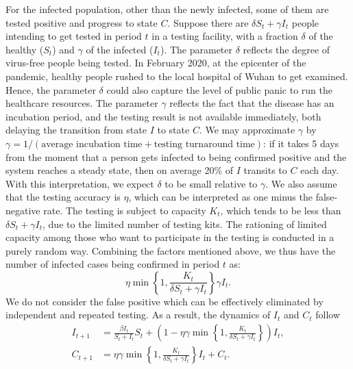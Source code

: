\documentclass[nonblindrev, copyedit]{informs3a}
\begin{document}
For the infected population, other than the newly infected, some of them are tested positive and progress to state $C$.
Suppose there are $\delta S_t+\gamma I_t$ people intending to get tested in period $t$ in a testing facility, with a fraction $\delta$ of the healthy ($S_t$) and $\gamma$ of the infected ($I_t$).
The parameter $\delta$ reflects the degree of virus-free people being tested. In February 2020, at the epicenter of the pandemic, healthy people rushed to the local hospital of Wuhan to get examined. Hence, the parameter $\delta$ could also capture the level of public panic to run the healthcare resources.
The parameter $\gamma$ reflects the fact that the disease has an incubation period, and the testing result is not available immediately, both delaying the transition from state $I$ to state $C$.
We may approximate $\gamma$ by $\gamma=1/(\text{average incubation time}+\text{testing turnaround time})$: if it takes 5 days from the moment that a person gets infected to being confirmed positive and the system reaches a steady state, then on average 20\% of $I$ transits to $C$ each day.
With this interpretation,
we expect $\delta$ to be small relative to $\gamma$.
We also assume that the testing accuracy is $\eta$, which can be interpreted as one minus the false-negative rate.
The testing is subject to capacity $K_t$, which tends to be less than $\delta S_t+\gamma I_t$, due to the limited number of testing kits.
The rationing of limited capacity among those who want to participate in the testing is conducted in a purely random way.
Combining the factors mentioned above, we thus have the number of
infected cases being confirmed in period $t$ as:
\begin{equation*}
    \eta\min\left\{1,\frac{K_t}{\delta S_{t}+\gamma I_{t}}\right\}\gamma I_{t}.
\end{equation*}
We do not consider the false positive which can be effectively eliminated by independent and repeated testing.
As a result, the dynamics of $I_t$ and $C_t$ follow
\begin{align}
I_{t+1}&=\frac{\beta I_{t}}{S_{t}+I_{t}}S_{t}+\left(1-\eta\gamma \min\left\{1,\frac{K_t}{\delta S_{t}+\gamma I_{t}}\right\}\right)I_{t},\label{eq:I_t recursive equation}\\
C_{t+1}&=\eta\gamma\min\left\{1,\frac{K_t}{\delta S_{t}+\gamma I_{t}}\right\}I_{t}+C_{t}.\label{eq:C_t recursive equation}
\end{align}
\end{document}
